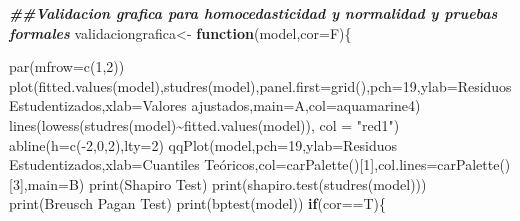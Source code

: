 \documentclass[
]{article}
\newenvironment{Shaded}{\begin{snugshade}}{\end{snugshade}}
\newcommand{\AttributeTok}[1]{\textcolor[rgb]{0.77,0.63,0.00}{#1}}
\newcommand{\ControlFlowTok}[1]{\textcolor[rgb]{0.13,0.29,0.53}{\textbf{#1}}}
\newcommand{\DecValTok}[1]{\textcolor[rgb]{0.00,0.00,0.81}{#1}}
\newcommand{\DocumentationTok}[1]{\textcolor[rgb]{0.56,0.35,0.01}{\textbf{\textit{#1}}}}
\newcommand{\FunctionTok}[1]{\textcolor[rgb]{0.00,0.00,0.00}{#1}}
\newcommand{\NormalTok}[1]{#1}
\newcommand{\OtherTok}[1]{\textcolor[rgb]{0.56,0.35,0.01}{#1}}
\newcommand{\SpecialCharTok}[1]{\textcolor[rgb]{0.00,0.00,0.00}{#1}}
\newcommand{\StringTok}[1]{\textcolor[rgb]{0.31,0.60,0.02}{#1}}
\begin{document}
\begin{Shaded}
\begin{Highlighting}[]
\DocumentationTok{\#\#Validacion grafica para homocedasticidad y normalidad y pruebas formales}
\NormalTok{validaciongrafica}\OtherTok{\textless{}{-}} \ControlFlowTok{function}\NormalTok{(model,}\AttributeTok{cor=}\NormalTok{F)\{}
  
  \FunctionTok{par}\NormalTok{(}\AttributeTok{mfrow=}\FunctionTok{c}\NormalTok{(}\DecValTok{1}\NormalTok{,}\DecValTok{2}\NormalTok{))}
  \FunctionTok{plot}\NormalTok{(}\FunctionTok{fitted.values}\NormalTok{(model),}\FunctionTok{studres}\NormalTok{(model),}\AttributeTok{panel.first=}\FunctionTok{grid}\NormalTok{(),}\AttributeTok{pch=}\DecValTok{19}\NormalTok{,}\AttributeTok{ylab=}\StringTok{\textquotesingle{}Residuos Estudentizados\textquotesingle{}}\NormalTok{,}\AttributeTok{xlab=}\StringTok{\textquotesingle{}Valores ajustados\textquotesingle{}}\NormalTok{,}\AttributeTok{main=}\StringTok{\textquotesingle{}A\textquotesingle{}}\NormalTok{,}\AttributeTok{col=}\StringTok{\textquotesingle{}aquamarine4\textquotesingle{}}\NormalTok{)}
  \FunctionTok{lines}\NormalTok{(}\FunctionTok{lowess}\NormalTok{(}\FunctionTok{studres}\NormalTok{(model)}\SpecialCharTok{\textasciitilde{}}\FunctionTok{fitted.values}\NormalTok{(model)), }\AttributeTok{col =} \StringTok{"red1"}\NormalTok{)}
  \FunctionTok{abline}\NormalTok{(}\AttributeTok{h=}\FunctionTok{c}\NormalTok{(}\SpecialCharTok{{-}}\DecValTok{2}\NormalTok{,}\DecValTok{0}\NormalTok{,}\DecValTok{2}\NormalTok{),}\AttributeTok{lty=}\DecValTok{2}\NormalTok{)}
  \FunctionTok{qqPlot}\NormalTok{(model,}\AttributeTok{pch=}\DecValTok{19}\NormalTok{,}\AttributeTok{ylab=}\StringTok{\textquotesingle{}Residuos Estudentizados\textquotesingle{}}\NormalTok{,}\AttributeTok{xlab=}\StringTok{\textquotesingle{}Cuantiles Teóricos\textquotesingle{}}\NormalTok{,}\AttributeTok{col=}\FunctionTok{carPalette}\NormalTok{()[}\DecValTok{1}\NormalTok{],}\AttributeTok{col.lines=}\FunctionTok{carPalette}\NormalTok{()[}\DecValTok{3}\NormalTok{],}\AttributeTok{main=}\StringTok{\textquotesingle{}B\textquotesingle{}}\NormalTok{)}
  \FunctionTok{print}\NormalTok{(}\StringTok{\textquotesingle{}Shapiro Test\textquotesingle{}}\NormalTok{)}
  \FunctionTok{print}\NormalTok{(}\FunctionTok{shapiro.test}\NormalTok{(}\FunctionTok{studres}\NormalTok{(model)))}
  \FunctionTok{print}\NormalTok{(}\StringTok{\textquotesingle{}Breusch Pagan Test\textquotesingle{}}\NormalTok{)}
  \FunctionTok{print}\NormalTok{(}\FunctionTok{bptest}\NormalTok{(model))}
  \ControlFlowTok{if}\NormalTok{(cor}\SpecialCharTok{==}\NormalTok{T)\{}

\end{Highlighting}
\end{Shaded}
\end{document}
